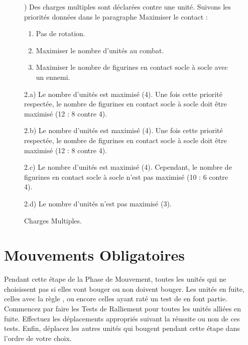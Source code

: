 \begin{figure}[!htbp]
\begin{minipage}{0.5\textwidth}
\def\svgwidth{\textwidth}

\end{minipage}\hfill\begin{minipage}{0.47\textwidth}
\caption{Charges Multiples.}
\label{figure/multiplecharges}

\vspace*{10pt}
) Des charges multiples sont déclarées contre une unité. Suivons les priorités données dans le paragraphe Maximiser le contact :
\begin{enumerate}
\item Pas de rotation.
\item Maximiser le nombre d'unités au combat.
\item Maximiser le nombre de figurines en contact socle à socle avec un ennemi.
\end{enumerate}

\vspace*{10pt}
\noindent 2.a) Le nombre d'unités est maximisé (4). Une fois cette priorité respectée, le nombre de figurines en contact socle à socle doit être maximisé (12 : 8 contre 4).

\vspace*{10pt}
\noindent 2.b) Le nombre d'unités est maximisé (4). Une fois cette priorité respectée, le nombre de figurines en contact socle à socle doit être maximisé (12 : 8 contre 4).

\vspace*{10pt}
\noindent 2.c) Le nombre d'unités est maximisé (4). Cependant, le nombre de figurines en contact socle à socle n'est pas maximisé (10 : 6 contre 4).

\vspace*{10pt}
\noindent 2.d) Le nombre d'unités n'est pas maximisé (3).
\end{minipage}
\end{figure}

\newpage
\hypertarget{compulsorymoves}{\section{Mouvements Obligatoires}}

Pendant cette étape de la Phase de Mouvement, toutes les unités qui ne choisissent pas si elles vont bouger ou non doivent bouger. Les unités en fuite, celles avec la règle \randommovement{}, ou encore celles ayant raté un test de \stupidity{} en font partie. Commencez par faire les Tests de Ralliement pour toutes les unités alliées en fuite. Effectuez les déplacements appropriés suivant la réussite ou non de ces tests. Enfin, déplacez les autres unités qui bougent pendant cette étape dans l'ordre de votre choix.

